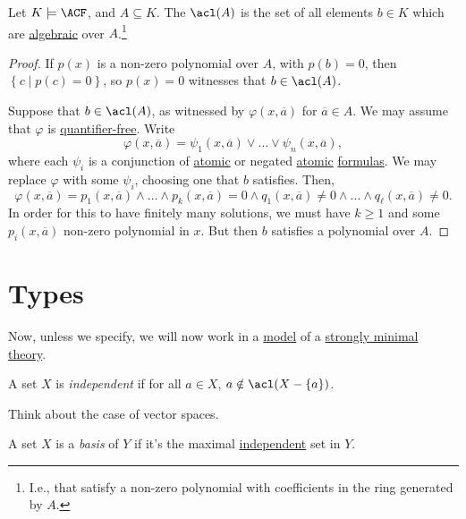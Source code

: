 \begin{theorem}
	Let \(K \models \ACF\), and \(A \subseteq K\). The \(\acl(A)\)  is the set of all elements \(b\in K\) which are \hyperref[def:algebraic]{algebraic} over \(A\).\footnote{I.e., that satisfy a non-zero polynomial with coefficients in the ring generated by \(A\).}
\end{theorem}
\begin{proof}
	If \(p(x)\) is a non-zero polynomial over \(A\), with \(p(b) = 0\), then \(\left\{ c \mid p(c) = 0 \right\} \), so \(p(x) = 0\) witnesses that \(b\in \acl(A)\).

	Suppose that \(b\in \acl(A)\), as witnessed by \(\varphi (x, \overline{a} )\) for \(\overline{a} \in A\). We may assume that \(\varphi \) is \hyperref[not:quantifier-free]{quantifier-free}. Write
	\[
		\varphi (x, \overline{a} ) = \psi _1(x, \overline{a} ) \lor \dots \lor \psi _n(x, \overline{a} ),
	\]
	where each \(\psi _i\) is a conjunction of \hyperref[not:atomic]{atomic} or negated \hyperref[not:atomic]{atomic} \hyperref[def:formula]{formulas}. We may replace \(\varphi \) with some \(\psi _i\), choosing one that \(b\) satisfies. Then,
	\[
		\varphi (x, \overline{a} ) = p_1(x, \overline{a} ) \land \dots \land p_k(x, \overline{a} ) = 0 \land q_1(x, \overline{a} ) \neq 0 \land \dots \land q_{\ell}(x, \overline{a} ) \neq 0.
	\]
	In order for this to have finitely many solutions, we must have \(k \geq 1\) and some \(p_i(x, \overline{a} )\) non-zero polynomial in \(x\). But then \(b\) satisfies a polynomial over \(A\).
\end{proof}

\section{Types}
Now, unless we specify, we will now work in a \hyperref[def:model]{model} of a \hyperref[def:strongly-minimal]{strongly minimal} \hyperref[def:theory]{theory}.

\begin{definition}[Independent]\label{def:independent}
	A set \(X\) is \emph{independent} if for all \(a\in X\), \(a \notin \acl(X - \left\{ a \right\} )\).
\end{definition}

\begin{intuition}
	Think about the case of vector spaces.
\end{intuition}

\begin{definition}[Basis]\label{def:basis}
	A set \(X\) is a \emph{basis} of \(Y\) if it's the maximal \hyperref[def:independent]{independent} set in \(Y\).
\end{definition}

